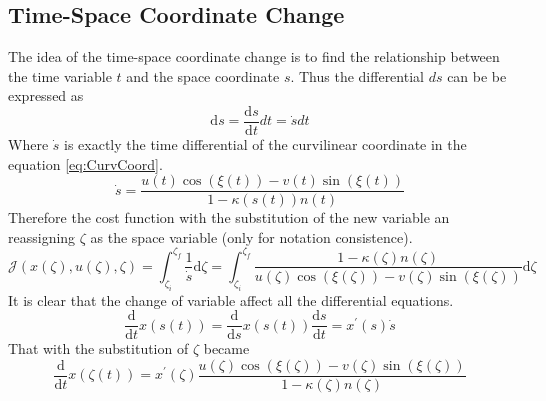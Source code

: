 \subsection{Time-Space Coordinate Change}
\label{subsec:T2S}
%
The idea of the time-space coordinate change is to find the relationship between the time variable $t$ and the space coordinate $s$. Thus the differential $ds$ can be be expressed as
%
\begin{equation}
    \mathrm{d} s =  \frac{\mathrm{d}s}{\mathrm{d}t} dt = \dot{s} dt
\end{equation}
%
Where $\dot{s}$ is exactly the time differential of the curvilinear coordinate in the equation \ref{eq:CurvCoord}.
%
\begin{equation}
    \label{eq:zetadot}
    \dot{s} = \frac{u(t) \cos(\xi(t)) - v(t) \sin(\xi(t))}{1-\kappa(s(t)) n(t)}
\end{equation}
%
Therefore the cost function with the substitution of the new variable an reassigning $\zeta$ as the space variable (only for notation consistence).
% 
\begin{equation}
    \mathcal{J}(x(\zeta), u(\zeta), \zeta) = \int_{\zeta_i}^{\zeta_f} \frac{1}{\dot{s}} \mathrm{d}\zeta = \int_{\zeta_i}^{\zeta_f} \frac{1-\kappa(\zeta) n(\zeta)}{u(\zeta) \cos(\xi(\zeta)) - v(\zeta) \sin(\xi(\zeta))} \mathrm{d}\zeta
\end{equation}
%
It is clear that the change of variable affect all the differential equations.
%
\begin{equation}
    \frac{\mathrm{d}}{\mathrm{d}t} x(s(t)) = \frac{\mathrm{d}}{\mathrm{d}s} x(s(t)) \frac{\mathrm{d} s}{\mathrm{d}t} = x^\prime(s) \dot{s}
\end{equation}
%
That with the substitution of $\zeta$ became
%
\begin{equation}
    \frac{\mathrm{d}}{\mathrm{d}t} x(\zeta(t)) = x^\prime(\zeta) \frac{u(\zeta) \cos(\xi(\zeta)) - v(\zeta) \sin(\xi(\zeta))}{1-\kappa(\zeta) n(\zeta)}
\end{equation}
%